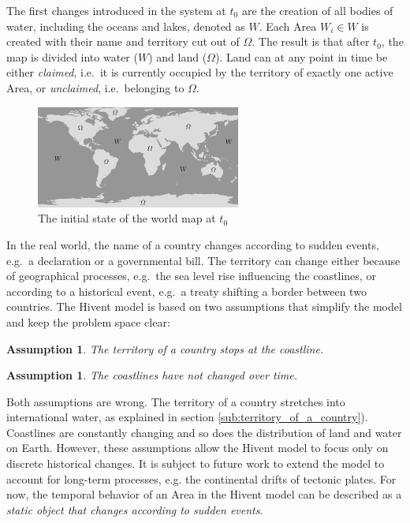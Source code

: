 The first changes introduced in the system at $t_0$ are the creation of all bodies of water, including the oceans and lakes, denoted as $W$. Each Area $W_i \in W$ is created with their name and territory cut out of $\Omega$. The result is that after $t_0$, the map is divided into water ($W$) and land ($\Omega$). Land can at any point in time be either \emph{claimed}, i.e.\ it is currently occupied by the territory of exactly one active Area, or \emph{unclaimed}, i.e.\ belonging to $\Omega$.

\begin{figure}[ht]
  \centering
  \includegraphics[width=0.6\textwidth]{graphics/development/hivent_model/init_map}
  \caption{The initial state of the world map at $t_0$}
  \label{fig:init_map}
\end{figure}

In the real world, the name of a country changes according to sudden events, e.g.\ a declaration or a governmental bill. The territory can change either because of geographical processes, e.g.\ the sea level rise influencing the coastlines, or according to a historical event, e.g.\ a treaty shifting a border between two countries. The Hivent model is based on two assumptions that simplify the model and keep the problem space clear:

\vspace{-0.0em}
\newtheorem{coastline_territory}[assicounter]{Assumption}
\begin{coastline_territory}
\label{axm:coastline_territory}
  The territory of a country stops at the coastline.
\end{coastline_territory}

\vspace{-1.5em}
\newtheorem{constant_coastlines}[assicounter]{Assumption}
\begin{constant_coastlines}
\label{axm:constant_coastlines}
  The coastlines have not changed over time.
\end{constant_coastlines}

Both assumptions are wrong. The territory of a country stretches into international water, as explained in section \ref{sub:territory_of_a_country}). Coastlines are constantly changing and so does the distribution of land and water on Earth. However, these assumptions allow the Hivent model to focus only on discrete historical changes. It is subject to future work to extend the model to account for long-term processes, e.g. the continental drifts of tectonic plates. For now, the temporal behavior of an Area in the Hivent model can be described as a \emph{static object that changes according to sudden events}.

